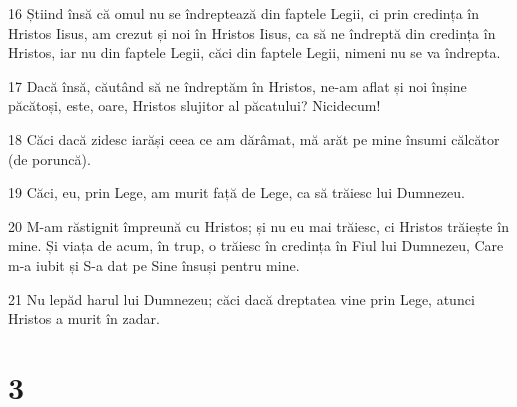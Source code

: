 \par 16 Știind însă că omul nu se îndreptează din faptele Legii, ci prin credința în Hristos Iisus, am crezut și noi în Hristos Iisus, ca să ne îndreptă din credința în Hristos, iar nu din faptele Legii, căci din faptele Legii, nimeni nu se va îndrepta.
\par 17 Dacă însă, căutând să ne îndreptăm în Hristos, ne-am aflat și noi înșine păcătoși, este, oare, Hristos slujitor al păcatului? Nicidecum!
\par 18 Căci dacă zidesc iarăși ceea ce am dărâmat, mă arăt pe mine însumi călcător (de poruncă).
\par 19 Căci, eu, prin Lege, am murit față de Lege, ca să trăiesc lui Dumnezeu.
\par 20 M-am răstignit împreună cu Hristos; și nu eu mai trăiesc, ci Hristos trăiește în mine. Și viața de acum, în trup, o trăiesc în credința în Fiul lui Dumnezeu, Care m-a iubit și S-a dat pe Sine însuși pentru mine.
\par 21 Nu lepăd harul lui Dumnezeu; căci dacă dreptatea vine prin Lege, atunci Hristos a murit în zadar.

\chapter{3}

